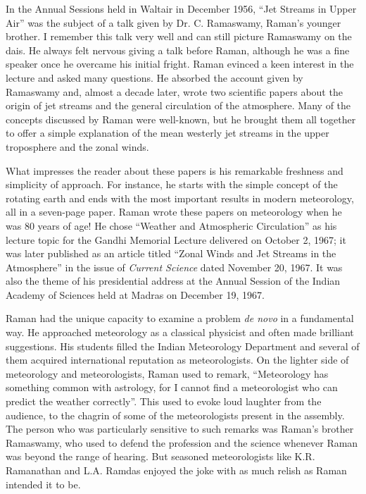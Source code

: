 In the Annual Sessions held in Waltair in December 1956, ``Jet Streams in Upper Air'' was the subject of a talk given by Dr. C. Ramaswamy, Raman's younger brother. I remember this talk very well and can still picture Ramaswamy on the dais. He always felt nervous giving a talk before Raman, although he was a fine speaker once he overcame his initial fright. Raman evinced a keen interest in the lecture and asked many questions. He absorbed the account given by Ramaswamy and, almost a decade later, wrote two scientific papers about the origin of jet streams and the general circulation of the atmosphere. Many of the concepts discussed by Raman were well-known, but he brought them all together to offer a simple explanation of the mean westerly jet streams in the upper troposphere and the zonal winds.

What impresses the reader about these papers is his remarkable freshness and simplicity of approach. For instance, he starts with the simple concept of the rotating earth and ends with the most important results in modern meteorology, all in a seven-page paper. Raman wrote these papers on meteorology when he was 80 years of age! He chose ``Weather and Atmospheric Circulation'' as his lecture topic for the Gandhi Memorial Lecture delivered on October 2, 1967; it was later published as an article titled ``Zonal Winds and Jet Streams in the Atmosphere'' in the issue of {\em Current Science} dated November 20, 1967. It was also the theme of his presidential address at the Annual Session of the Indian Academy of Sciences held at Madras on December 19, 1967.


Raman had the unique capacity to examine a problem {\em de novo} in a fundamental way. He approached meteorology as a classical physicist and often made brilliant suggestions. His students filled the Indian Meteorology Department and several of them acquired international reputation as meteorologists. On the lighter side of meteorology and meteorologists, Raman used to remark, ``Meteorology has something common with astrology, for I cannot find a meteorologist who can predict the weather correctly''. This used to evoke loud laughter from the audience, to the chagrin of some of the meteorologists present in the assembly. The person who was particularly sensitive to such remarks was Raman's brother Ramaswamy, who used to defend the profession and the science whenever Raman was beyond the range of hearing. But seasoned meteorologists like K.R. Ramanathan and L.A. Ramdas enjoyed the joke with as much relish as Raman intended it to be.

